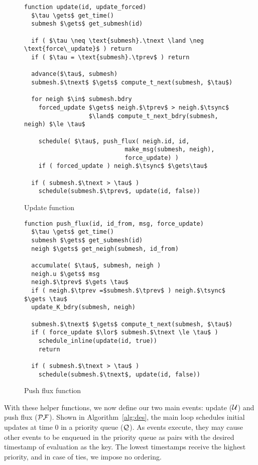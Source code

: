 \begin{figure}
\begin{lstlisting}[mathescape=true, basicstyle=\scriptsize]
function update(id, update_forced)
  $\tau \gets$ get_time()
  submesh $\gets$ get_submesh(id)

  if ( $\tau \neq \text{submesh}.\tnext \land \neg \text{force\_update}$ ) return
  if ( $\tau = \text{submesh}.\tprev$ ) return
    
  advance($\tau$, submesh)
  submesh.$\tnext$ $\gets$ compute_t_next(submesh, $\tau$)
  
  for neigh $\in$ submesh.bdry
    forced_update $\gets$ neigh.$\tprev$ > neigh.$\tsync$
                  $\land$ compute_t_next_bdry(submesh, neigh) $\le \tau$
                  
    schedule( $\tau$, push_flux( neigh.id, id,
                            make_msg(submesh, neigh),
                            force_update) )
    if ( forced_update ) neigh.$\tsync$ $\gets\tau$
    
  if ( submesh.$\tnext > \tau$ )
    schedule(submesh.$\tprev$, update(id, false))
\end{lstlisting}
\caption{Update function}
\end{figure}

\begin{figure}
\begin{lstlisting}[mathescape=true,basicstyle=\scriptsize]
function push_flux(id, id_from, msg, force_update)
  $\tau \gets$ get_time()
  submesh $\gets$ get_submesh(id)
  neigh $\gets$ get_neigh(submesh, id_from)
  
  accumulate( $\tau$, submesh, neigh )
  neigh.u $\gets$ msg
  neigh.$\tprev$ $\gets \tau$
  if ( neigh.$\tprev =$submesh.$\tprev$ ) neigh.$\tsync$ $\gets \tau$
  update_K_bdry(submesh, neigh)
  
  submesh.$\tnext$ $\gets$ compute_t_next(submesh, $\tau$)
  if ( force_update $\lor$ submesh.$\tnext \le \tau$ )
    schedule_inline(update(id, true))
    return
    
  if ( submesh.$\tnext > \tau$ )
    schedule(submesh.$\tnext$, update(id, false))
\end{lstlisting}
\caption{Push flux function}
\end{figure}

With these helper functions, we now define our two main events: update ($\mathcal{U}$) and push flux ($\mathcal{PF}$). Shown in Algorithm~\ref{alg:des}, the main loop schedules initial updates at time 0 in a priority queue ($\mathcal{Q}$). As events execute, they may cause other events to be enqueued in the priority queue as pairs with the desired timestamp of evaluation as the key. The lowest timestamps receive the highest priority, and in case of ties, we impose no ordering.

